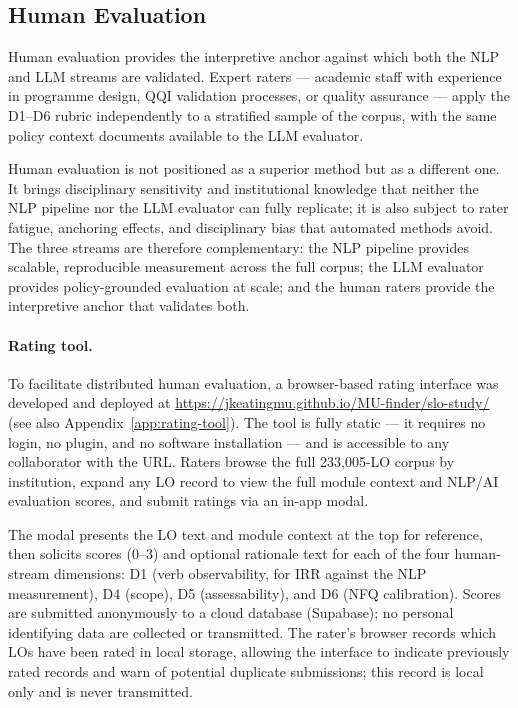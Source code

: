 \documentclass[12pt, a4paper]{article}
\begin{document}
\subsection{Human Evaluation}
\label{sec:human-eval}

Human evaluation provides the interpretive anchor against which both the NLP
and LLM streams are validated. Expert raters --- academic staff with experience in
programme design, QQI validation processes, or quality assurance --- apply the
D1--D6 rubric independently to a stratified sample of the corpus, with the same
policy context documents available to the LLM evaluator.

Human evaluation is not positioned as a superior method but as a different one.
It brings disciplinary sensitivity and institutional knowledge that neither the NLP
pipeline nor the LLM evaluator can fully replicate; it is also subject to rater
fatigue, anchoring effects, and disciplinary bias that automated methods avoid.
The three streams are therefore complementary: the NLP pipeline provides scalable,
reproducible measurement across the full corpus; the LLM evaluator provides
policy-grounded evaluation at scale; and the human raters provide the interpretive
anchor that validates both.

\paragraph{Rating tool.}
To facilitate distributed human evaluation, a browser-based rating interface was
developed and deployed at
\url{https://jkeatingmu.github.io/MU-finder/slo-study/}
(see also Appendix~\ref{app:rating-tool}). The tool is fully static --- it requires
no login, no plugin, and no software installation --- and is accessible to any
collaborator with the URL. Raters browse the full 233,005-LO corpus by institution,
expand any LO record to view the full module context and NLP/AI evaluation scores,
and submit ratings via an in-app modal.

The modal presents the LO text and module context at the top for reference, then
solicits scores (0--3) and optional rationale text for each of the four human-stream
dimensions: D1 (verb observability, for IRR against the NLP measurement), D4 (scope),
D5 (assessability), and D6 (NFQ calibration). Scores are submitted anonymously to a
cloud database (Supabase); no personal identifying data are collected or transmitted.
The rater's browser records which LOs have been rated in local storage, allowing the
interface to indicate previously rated records and warn of potential duplicate
submissions; this record is local only and is never transmitted.
\end{document}
